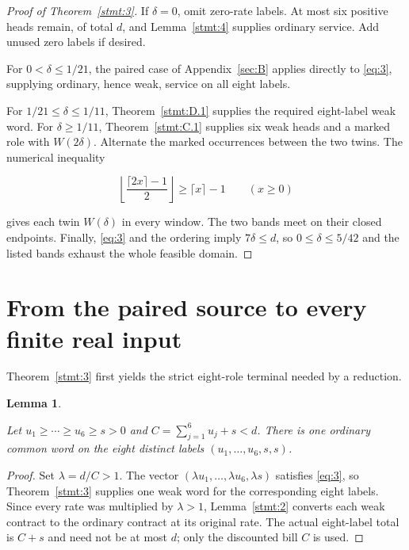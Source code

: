 \documentclass[11pt,a4paper]{article}
\newtheorem{lemma}[theorem]{Lemma}
\begin{document}
\begin{proof}[Proof of Theorem~\ref{stmt:3}]

 If \(\delta=0\), omit zero-rate labels. At most six positive heads remain, of total \(d\), and Lemma~\ref{stmt:4} supplies ordinary service. Add unused zero labels if desired.

For \(0<\delta\le1/21\), the paired case of Appendix~\ref{sec:B} applies directly to \eqref{eq:3}, supplying ordinary, hence weak, service on all eight labels.

For \(1/21\le\delta\le1/11\), Theorem~\ref{stmt:D.1} supplies the required eight-label weak word. For \(\delta\ge1/11\), Theorem~\ref{stmt:C.1} supplies six weak heads and a marked role with \(W(2\delta)\). Alternate the marked occurrences between the two twins. The numerical inequality

\begin{equation}
\left\lfloor\frac{\lceil2x\rceil-1}{2}\right\rfloor
                 \ge\lceil x\rceil-1\qquad(x\ge0)
\tag{4}\label{eq:4}
\end{equation}

gives each twin \(W(\delta)\) in every window. The two bands meet on their closed endpoints. Finally, \eqref{eq:3} and the ordering imply \(7\delta\le d\), so \(0\le\delta\le5/42\) and the listed bands exhaust the whole feasible domain. 

\end{proof}

\section{From the paired source to every finite real input}\label{sec:4}

Theorem~\ref{stmt:3} first yields the strict eight-role terminal needed by a reduction.

\begin{lemma}\label{stmt:5}

 Let \(u_1\ge\cdots\ge u_6\ge s>0\) and \(C=\sum_{j=1}^{6}u_j+s<d\). There is one ordinary common word on the eight distinct labels \((u_1,\ldots,u_6,s,s)\).

\end{lemma}

\begin{proof}

 Set \(\lambda=d/C>1\). The vector \((\lambda u_1,\ldots,\lambda u_6,\lambda s)\) satisfies \eqref{eq:3}, so Theorem~\ref{stmt:3} supplies one weak word for the corresponding eight labels. Since every rate was multiplied by \(\lambda>1\), Lemma~\ref{stmt:2} converts each weak contract to the ordinary contract at its original rate. The actual eight-label total is \(C+s\) and need not be at most \(d\); only the discounted bill \(C\) is used. 

\end{proof}
\end{document}
